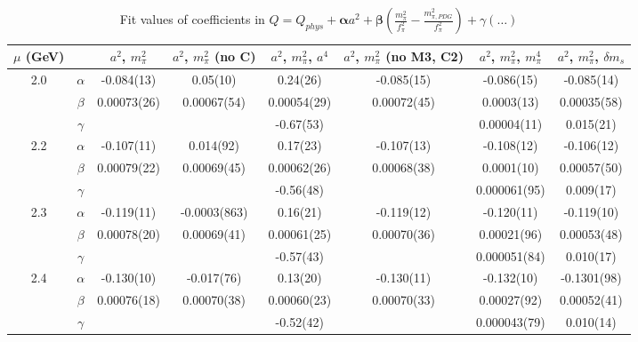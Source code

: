 \documentclass[12pt]{extarticle}
\begin{document}
\begin{table}[h!]
\begin{center}
\begin{tabular}{|c c|c|c|c|c|c|c|}
\hline
$\mu$ (GeV) &  & $a^2$, $m_\pi^2$& $a^2$, $m_\pi^2$ (no C)& $a^2$, $m_\pi^2$, $a^4$& $a^2$, $m_\pi^2$ (no M3, C2)& $a^2$, $m_\pi^2$, $m_\pi^4$& $a^2$, $m_\pi^2$, $\delta m_s$\\
\hline
\multirow{3}{0.5in}{2.0} & $\alpha$ & -0.084(13)& 0.05(10)& 0.24(26)& -0.085(15)& -0.086(15)& -0.085(14)\\
 & $\beta$ & 0.00073(26)& 0.00067(54)& 0.00054(29)& 0.00072(45)& 0.0003(13)& 0.00035(58)\\
 & $\gamma$ &  &  & -0.67(53)&  & 0.00004(11)& 0.015(21)\\
\hline
\multirow{3}{0.5in}{2.2} & $\alpha$ & -0.107(11)& 0.014(92)& 0.17(23)& -0.107(13)& -0.108(12)& -0.106(12)\\
 & $\beta$ & 0.00079(22)& 0.00069(45)& 0.00062(26)& 0.00068(38)& 0.0001(10)& 0.00057(50)\\
 & $\gamma$ &  &  & -0.56(48)&  & 0.000061(95)& 0.009(17)\\
\hline
\multirow{3}{0.5in}{2.3} & $\alpha$ & -0.119(11)& -0.0003(863)& 0.16(21)& -0.119(12)& -0.120(11)& -0.119(10)\\
 & $\beta$ & 0.00078(20)& 0.00069(41)& 0.00061(25)& 0.00070(36)& 0.00021(96)& 0.00053(48)\\
 & $\gamma$ &  &  & -0.57(43)&  & 0.000051(84)& 0.010(17)\\
\hline
\multirow{3}{0.5in}{2.4} & $\alpha$ & -0.130(10)& -0.017(76)& 0.13(20)& -0.130(11)& -0.132(10)& -0.1301(98)\\
 & $\beta$ & 0.00076(18)& 0.00070(38)& 0.00060(23)& 0.00070(33)& 0.00027(92)& 0.00052(41)\\
 & $\gamma$ &  &  & -0.52(42)&  & 0.000043(79)& 0.010(14)\\
\hline
\end{tabular}
\caption{Fit values of coefficients in $Q = Q_{phys} + \mathbf{\alpha} a^2 + \mathbf{\beta}\left(\frac{m_\pi^2}{f_\pi^2}-\frac{m_{\pi,PDG}^2}{f_\pi^2}\right) + \gamma(\ldots)$}
\end{center}
\end{table}






\end{document}
